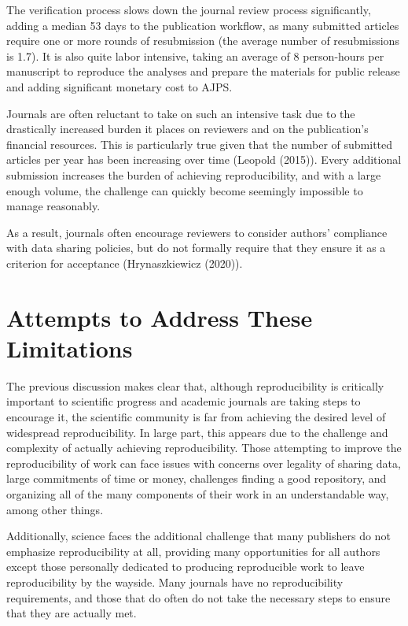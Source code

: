 \documentclass[12pt,twoside]{reedthesis}
\begin{document}
The verification process slows down the journal review process
significantly, adding a median 53 days to the publication workflow, as
many submitted articles require one or more rounds of resubmission (the
average number of resubmissions is 1.7). It is also quite labor
intensive, taking an average of 8 person-hours per manuscript to
reproduce the analyses and prepare the materials for public release and
adding significant monetary cost to AJPS.

Journals are often reluctant to take on such an intensive task due to
the drastically increased burden it places on reviewers and on the
publication's financial resources. This is particularly true given that
the number of submitted articles per year has been increasing over time
(Leopold (2015)). Every additional submission increases the burden of
achieving reproducibility, and with a large enough volume, the challenge
can quickly become seemingly impossible to manage reasonably.

As a result, journals often encourage reviewers to consider authors'
compliance with data sharing policies, but do not formally require that
they ensure it as a criterion for acceptance (Hrynaszkiewicz (2020)).

\section{Attempts to Address These
Limitations}\label{attempts-to-address-these-limitations}

The previous discussion makes clear that, although reproducibility is
critically important to scientific progress and academic journals are
taking steps to encourage it, the scientific community is far from
achieving the desired level of widespread reproducibility. In large
part, this appears due to the challenge and complexity of actually
achieving reproducibility. Those attempting to improve the
reproducibility of work can face issues with concerns over legality of
sharing data, large commitments of time or money, challenges finding a
good repository, and organizing all of the many components of their work
in an understandable way, among other things.

Additionally, science faces the additional challenge that many
publishers do not emphasize reproducibility at all, providing many
opportunities for all authors except those personally dedicated to
producing reproducible work to leave reproducibility by the wayside.
Many journals have no reproducibility requirements, and those that do
often do not take the necessary steps to ensure that they are actually
met.
\end{document}
